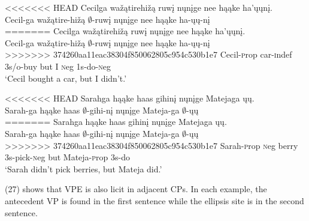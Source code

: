 \documentclass[output=paper]{LSP/langsci}
\begin{document}
\begin{exe}
\ex
\begin{xlist}
\ex
<<<<<<< HEAD
\glll Cecilga wažątirehižą ruwį nųnįge nee hąąke ha'ųųnį.\\
Cecil-ga wažątire-hižą $\emptyset$-ruwį nųnįge nee hąąke ha-ųų-nį\\
=======
\glll Cecilga wa\v{z}\k{a}tirehi\v{z}\k{a} ruw\k{i} n\k{u}n\k{i}ge nee h\k{a}\k{a}ke ha'\k{u}\k{u}n\k{i}.\\
Cecil-ga wa\v{z}\k{a}tire-hi\v{z}\k{a} $\emptyset$-ruw\k{i} n\k{u}n\k{i}ge nee h\k{a}\k{a}ke ha-\k{u}\k{u}-n\k{i}\\
>>>>>>> 374260aa11eac38304f850062805c954c530b1e7
Cecil-{\textsc prop} car-{\textsc indef} {\textsc 3s/o}-buy but I {\textsc neg} {\textsc 1s}-do-{\textsc neg}\\
\trans `Cecil bought a car, but I didn't.'

\ex
<<<<<<< HEAD
\glll Sarahga hąąke haas gihinį nųnįge Matejaga ųų.\\
Sarah-ga hąąke haas $\emptyset$-gihi-nį nųnįge Mateja-ga $\emptyset$-ųų\\
=======
\glll Sarahga h\k{a}\k{a}ke haas gihin\k{i} n\k{u}n\k{i}ge Matejaga \k{u}\k{u}.\\
Sarah-ga h\k{a}\k{a}ke haas $\emptyset$-gihi-n\k{i} n\k{u}n\k{i}ge Mateja-ga $\emptyset$-\k{u}\k{u}\\
>>>>>>> 374260aa11eac38304f850062805c954c530b1e7
Sarah-{\textsc prop} {\textsc neg} berry {\textsc 3s}-pick-{\textsc neg} but Mateja-{\textsc prop} {\textsc 3s}-do\\
\trans `Sarah didn't pick berries, but Mateja did.'
\end{xlist}
\end{exe}


(27) shows that VPE is also licit in adjacent CPs. In each example, the antecedent VP is found in the first sentence while the ellipsis site is in the second sentence.
\end{document}
